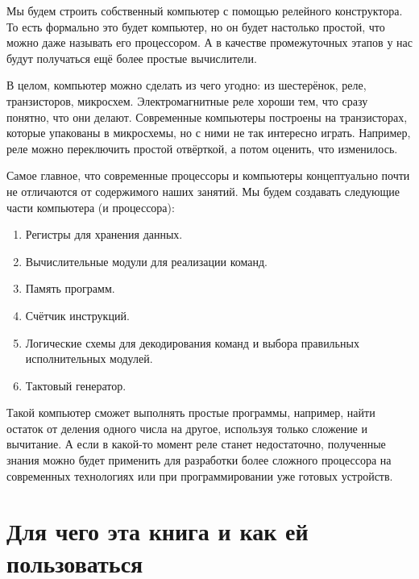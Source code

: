 Мы будем строить собственный компьютер с помощью релейного конструктора.
То есть формально это будет компьютер, но он будет настолько простой, что можно даже
называть его процессором. А в качестве промежуточных этапов у нас будут получаться
ещё более простые вычислители.

В целом, компьютер можно сделать из чего угодно: из шестерёнок, реле, транзисторов,
микросхем.
Электромагнитные реле хороши тем, что сразу понятно, что они делают.
Современные компьютеры построены на транзисторах, которые упакованы в микросхемы,
но с ними не так интересно играть. Например, реле можно переключить простой отвёрткой,
а потом оценить, что изменилось.

Самое главное, что современные процессоры и компьютеры концептуально
почти не отличаются от содержимого наших занятий.
Мы будем создавать следующие части компьютера (и процессора):
\begin{enumerate}
    \item Регистры для хранения данных.
    \item Вычислительные модули для реализации команд.
    \item Память программ.
    \item Счётчик инструкций.
    \item Логические схемы для декодирования команд и выбора правильных исполнительных модулей.
    \item Тактовый генератор.
\end{enumerate}

Такой компьютер сможет выполнять простые программы, например, найти остаток от деления одного числа на другое,
используя только сложение и вычитание. А если в какой-то момент реле станет недостаточно,
полученные знания можно будет применить для разработки более сложного процессора
на современных технологиях или при программировании уже готовых устройств.

\section*{Для чего эта книга и как ей пользоваться}
